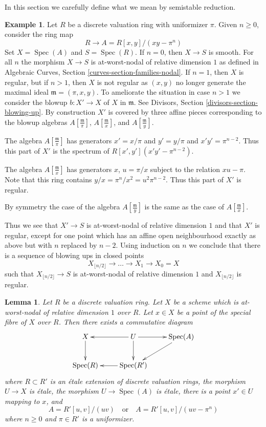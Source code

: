 \documentclass{stacks-project}
\theoremstyle{plain}
\newtheorem{lemma}[subsection]{Lemma}
\theoremstyle{definition}
\newtheorem{example}[subsection]{Example}
\theoremstyle{remark}
\numberwithin{equation}{subsection}
\def\Spec{\mathop{\mathrm{Spec}}}
\begin{document}
\noindent
In this section we carefully define what we mean by semistable reduction.

\begin{example}
\label{example-blowup}
Let $R$ be a discrete valuation ring with uniformizer $\pi$.
Given $n \geq 0$, consider the ring map
$$
R \longrightarrow A = R[x, y]/(xy - \pi^n)
$$
Set $X = \Spec(A)$ and $S = \Spec(R)$.
If $n = 0$, then $X \to S$ is smooth.
For all $n$ the morphism $X \to S$ is at-worst-nodal
of relative dimension $1$ as defined in
Algebraic Curves, Section \ref{curves-section-families-nodal}.
If $n = 1$, then $X$ is regular, but if $n > 1$, then $X$ is not
regular as $(x, y)$ no longer generate the maximal ideal
$\mathfrak m = (\pi, x, y)$. To ameliorate the situation
in case $n > 1$ we
consider the blowup $b : X' \to X$ of $X$ in $\mathfrak m$.
See Divisors, Section \ref{divisors-section-blowing-up}.
By construction $X'$ is covered by three affine pieces
corresponding to the blowup algebras $A[\frac{\mathfrak m}{\pi}]$,
$A[\frac{\mathfrak m}{x}]$, and $A[\frac{\mathfrak m}{y}]$.

\medskip\noindent
The algebra $A[\frac{\mathfrak m}{\pi}]$ has generators
$x' = x/\pi$ and $y' = y/\pi$ and $x'y' = \pi^{n - 2}$.
Thus this part of $X'$ is the spectrum of $R[x', y'](x'y' - \pi^{n - 2})$.

\medskip\noindent
The algebra $A[\frac{\mathfrak m}{x}]$ has generators $x$,
$u = \pi/x$ subject to the relation $xu - \pi$. Note that this ring
contains $y/x = \pi^n/x^2 = u^2\pi^{n - 2}$. Thus this part of
$X'$ is regular.

\medskip\noindent
By symmetry the case of the algebra $A[\frac{\mathfrak m}{y}]$ is
the same as the case of $A[\frac{\mathfrak m}{x}]$.

\medskip\noindent
Thus we see that $X' \to S$ is at-worst-nodal of relative dimension $1$
and that $X'$ is regular, except for one point which has an
affine open neighbourhood exactly as above but with $n$ replaced by $n - 2$.
Using induction on $n$ we conclude that there is a sequence of
blowing ups in closed points
$$
X_{\lfloor n/2 \rfloor} \to \ldots \to X_1 \to X_0 = X
$$
such that $X_{\lfloor n/2 \rfloor} \to S$ is
at-worst-nodal of relative dimension $1$ and
$X_{\lfloor n/2 \rfloor}$ is regular.
\end{example}

\begin{lemma}
\label{lemma-etale-local-at-worst-nodal}
Let $R$ be a discrete valuation ring. Let $X$ be a scheme which is
at-worst-nodal of relative dimension $1$ over $R$.
Let $x \in X$ be a point of the special fibre
of $X$ over $R$. Then there exists a commutative diagram
$$
\xymatrix{
X \ar[d] &
U \ar[r] \ar[d] \ar[l] &
\Spec(A) \ar[dl] \\
\Spec(R) &
\Spec(R') \ar[l]
}
$$
where $R \subset R'$ is an \'etale extension of discrete valuation rings,
the morphism $U \to X$ is \'etale, the morphism $U \to \Spec(A)$ is \'etale,
there is a point $x' \in U$ mapping to $x$, and
$$
A = R'[u, v]/(uv)
\quad\text{or}\quad
A = R'[u, v]/(uv - \pi^n)
$$
where $n \geq 0$ and $\pi \in R'$ is a uniformizer.
\end{lemma}
\end{document}
